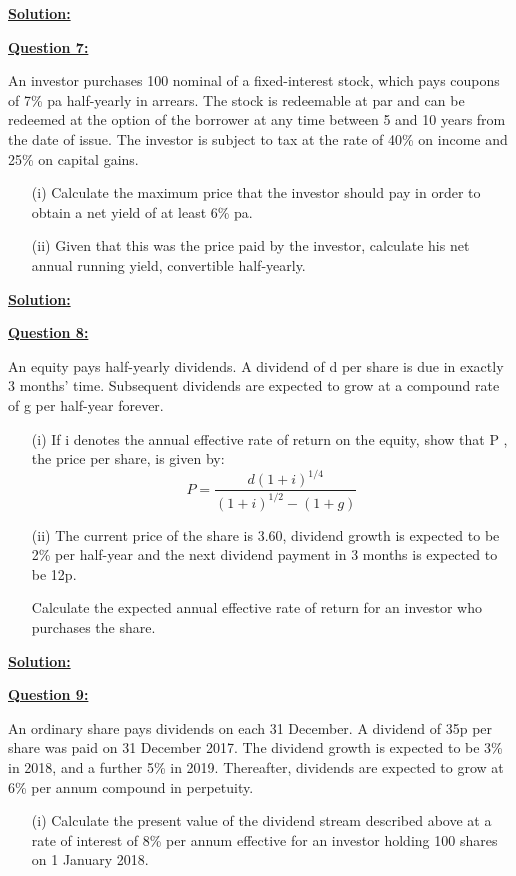 \documentclass[11pt, answers]{exam}
\begin{document}
\underline{\textbf{Solution:}}\bigskip


\underline{\textbf{Question 7:}}\bigskip

An investor purchases 100 nominal of a fixed-interest stock, which pays coupons of 7\% pa
half-yearly in arrears. The stock is redeemable at par and can be redeemed at the option of the borrower at any time between 5 and 10 years from the date of issue. The investor is subject to tax at the rate of 40\% on income and 25\% on capital gains.
\begin{itemize}
\item[(i)] Calculate the maximum price that the investor should pay in order to obtain a net yield of at least 6\% pa. 
\item[(ii)] Given that this was the price paid by the investor, calculate his net annual running yield, convertible half-yearly.
\end{itemize}
\bigskip\bigskip

\underline{\textbf{Solution:}}\bigskip


\underline{\textbf{Question 8:}}\bigskip

An equity pays half-yearly dividends. A dividend of d per share is due in exactly 3 months’ time. Subsequent dividends are expected to grow at a compound rate of g per half-year forever.
\begin{itemize}
\item[(i)] If i denotes the annual effective rate of return on the equity, show that P , the price per share, is given by:
$$P=\frac{d(1+i)^{1/4}}{(1+i)^{1/2}-(1+g)}$$
\item[(ii)] The current price of the share is 3.60, dividend growth is expected to be 2\% per half-year and the next dividend payment in 3 months is expected to be 12p.

Calculate the expected annual effective rate of return for an investor who purchases the share.
\end{itemize}
\bigskip\bigskip

\underline{\textbf{Solution:}}\bigskip

\underline{\textbf{Question 9:}}\bigskip

An ordinary share pays dividends on each 31 December. A dividend of 35p per share was paid on
31 December 2017. The dividend growth is expected to be 3\% in 2018, and a further 5\% in 2019. Thereafter, dividends are expected to grow at 6\% per annum compound in perpetuity.
\begin{itemize}
\item[(i)] Calculate the present value of the dividend stream described above at a rate of interest of 8\% per annum effective for an investor holding 100 shares on 1 January 2018. 
\end{itemize}
\bigskip
\end{document}
